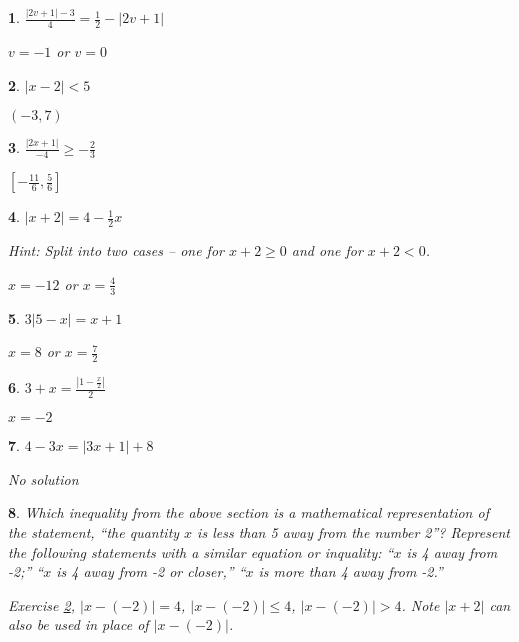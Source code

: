 \documentclass{amsbook}
\newtheorem{exc}{}
\newenvironment{ex}{\begin{exc}\normalfont}{\end{exc}}
\numberwithin{section}{chapter}
\numberwithin{equation}{chapter}
\newcommand{\ds}{\displaystyle}
\begin{document}
\begin{multicols}{2}
\begin{ex}
	$\ds{ \frac{|2v+1|-3}{4} = \frac{1}{2} - |2v+1|}$
	\begin{sol}
		$v=-1$ or $v=0$
	\end{sol}
\end{ex}

\begin{ex} \label{distanceIneq}
	$\ds{ |x-2| < 5 }$
	\begin{sol}
		$(-3, 7)$
	\end{sol}
\end{ex}

\begin{ex}
	$\ds{ \frac{|2x+1|}{-4} \geq -\frac{2}{3} }$
	\begin{sol}
		$\left[ -\frac{11}{6}, \frac{5}{6} \right]$
	\end{sol}
\end{ex}

\begin{ex}
	$\ds{ |x+2| = 4-\frac{1}{2}x }$
	
	Hint: Split into two cases -- one for $x+2 \geq 0$ and one for $x+2 < 0$.
	\begin{sol}
		$x=-12$ or $x=\frac{4}{3}$
	\end{sol}
\end{ex}

\begin{ex}
	$\ds{ 3|5-x| = x+1 }$
	
	\begin{sol}
		$x=8$ or $x=\frac{7}{2}$
	\end{sol}
\end{ex}
\begin{ex}
	$\ds{ 3+x = \frac{\ds\left| 1-\frac{x}{2} \right|}{2} }$
	
	\begin{sol}
		$x=-2$
	\end{sol}
\end{ex}

\begin{ex}
	$\ds{ 4-3x = |3x+1|+8 }$
	
	\begin{sol}
		No solution
	\end{sol}
\end{ex}	
\end{multicols}

\begin{ex}
	Which inequality from the above section is a mathematical representation of the statement, ``the quantity $x$ is less than 5 away from the number 2''? Represent the following statements with a similar equation or inquality: ``$x$ is 4 away from -2;'' ``$x$ is 4 away from -2 or closer,'' ``$x$ is more than 4 away from -2.''
	\begin{sol}
		Exercise \ref{distanceIneq}, $|x-(-2)| = 4$, $|x-(-2)| \leq 4$, $|x-(-2)| > 4$. Note $|x+2|$ can also be used in place of $|x-(-2)|$.
	\end{sol}
\end{ex}
\end{document}
